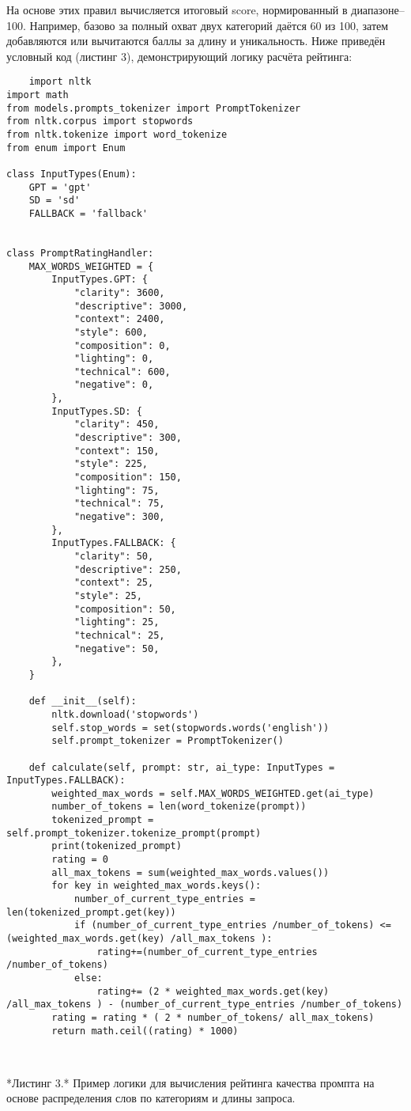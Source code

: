 На основе этих правил вычисляется итоговый score, нормированный в диапазоне–100. Например, базово за полный охват двух категорий даётся 60 из 100, затем добавляются или вычитаются баллы за длину и уникальность. Ниже приведён условный код (листинг 3), демонстрирующий логику расчёта рейтинга:
\begin{verbatim}
    import nltk
import math
from models.prompts_tokenizer import PromptTokenizer
from nltk.corpus import stopwords
from nltk.tokenize import word_tokenize
from enum import Enum

class InputTypes(Enum):
    GPT = 'gpt'
    SD = 'sd'
    FALLBACK = 'fallback'


class PromptRatingHandler:
    MAX_WORDS_WEIGHTED = {
        InputTypes.GPT: {
            "clarity": 3600,
            "descriptive": 3000,
            "context": 2400,
            "style": 600,
            "composition": 0,
            "lighting": 0,
            "technical": 600,
            "negative": 0,
        },
        InputTypes.SD: {
            "clarity": 450,
            "descriptive": 300,
            "context": 150,
            "style": 225,
            "composition": 150,
            "lighting": 75,
            "technical": 75,
            "negative": 300,
        },
        InputTypes.FALLBACK: {
            "clarity": 50,
            "descriptive": 250,
            "context": 25,
            "style": 25,
            "composition": 50,
            "lighting": 25,
            "technical": 25,
            "negative": 50,
        },
    }

    def __init__(self):
        nltk.download('stopwords')
        self.stop_words = set(stopwords.words('english'))
        self.prompt_tokenizer = PromptTokenizer()

    def calculate(self, prompt: str, ai_type: InputTypes = InputTypes.FALLBACK):
        weighted_max_words = self.MAX_WORDS_WEIGHTED.get(ai_type)
        number_of_tokens = len(word_tokenize(prompt))
        tokenized_prompt = self.prompt_tokenizer.tokenize_prompt(prompt)
        print(tokenized_prompt)
        rating = 0
        all_max_tokens = sum(weighted_max_words.values())
        for key in weighted_max_words.keys():
            number_of_current_type_entries = len(tokenized_prompt.get(key))
            if (number_of_current_type_entries /number_of_tokens) <= (weighted_max_words.get(key) /all_max_tokens ):
                rating+=(number_of_current_type_entries /number_of_tokens)
            else:
                rating+= (2 * weighted_max_words.get(key) /all_max_tokens ) - (number_of_current_type_entries /number_of_tokens)
        rating = rating * ( 2 * number_of_tokens/ all_max_tokens)
        return math.ceil((rating) * 1000)



\end{verbatim}
*Листинг 3.* Пример логики для вычисления рейтинга качества промпта на основе распределения слов по категориям и длины запроса.

